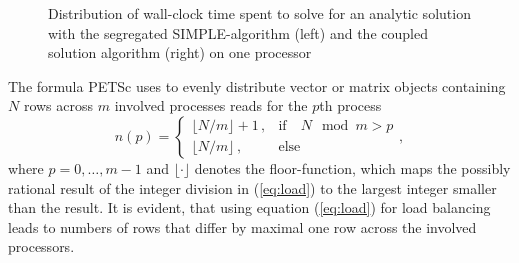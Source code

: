 \begin{figure}[!h]
  \centering
  \begin{minipage}{0.45\textwidth}
\hfil
\end{minipage}
  \begin{minipage}{0.45\textwidth}
\end{minipage}
\caption{Distribution of wall-clock time spent to solve for an analytic solution with the segregated SIMPLE-algorithm (left) and the coupled solution algorithm (right) on one processor}
\label{fig:barbalance}
\end{figure}

The formula PETSc uses to evenly distribute vector or matrix objects containing \(N\) rows across \(m\) involved processes reads for the \(p\)th process
\begin{equation}
  \label{eq:load}
n(p)
=
\left\{\begin{array}{ll} 
    \lfloor N/m \rfloor + 1\,, & \text{if} \quad  N \mod m > p \\
    \lfloor N/m \rfloor \,, & \text{else}
\end{array}\right.
,
\end{equation}
where \(p = 0,\dots,m-1\) and \(\lfloor \cdot \rfloor\) denotes the floor-function, which maps the possibly rational result of the integer division in (\ref{eq:load}) to the largest integer smaller than the result. It is evident, that using equation (\ref{eq:load}) for load balancing leads to numbers of rows that differ by maximal one row across the involved processors.

